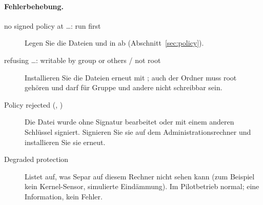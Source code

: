 \documentclass[11pt,a4paper]{article}
\begin{document}
\paragraph{Fehlerbehebung.}
\begin{description}
  \item[\glqq no signed policy at \ldots: run  first\grqq]
    Legen Sie die Dateien  und  in  ab (Abschnitt~\ref{sec:policy}).
  \item[\glqq refusing \ldots: writable by group or others\grqq{} / \glqq not root\grqq] Installieren
    Sie die Dateien erneut mit ; auch der Ordner
     muss root gehören und darf für Gruppe und andere nicht schreibbar sein.
  \item[Policy rejected (, )] Die Datei wurde ohne Signatur
    bearbeitet oder mit einem anderen Schlüssel signiert. Signieren Sie sie auf dem
    Administrationsrechner und installieren Sie sie erneut.
  \item[Degraded protection] Listet auf, was Separ auf diesem Rechner nicht sehen kann (zum
    Beispiel kein Kernel-Sensor, simulierte Eindämmung). Im Pilotbetrieb normal; eine Information,
    kein Fehler.
\end{description}

\end{document}
